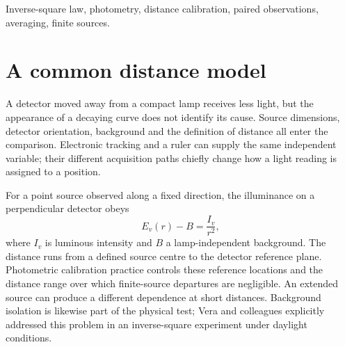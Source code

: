 \begin{abstract}
An inverse-square photometry experiment tests a distance dependence only after light and position have been associated with the same optical state. Two example investigations compare electronically tracked position with paired ruler observations. Fifteen stationary electronic windows give a power exponent of 2.0012. Twelve ruler snapshots give 1.9861; replacing each snapshot with a two-second interior mean gives 1.9880 while reducing the scatter of the distance-normalized signal from 1.82 to 0.58 count\,m$^2$. A one-millimetre change of distance origin shifts either mean-based exponent by approximately 0.005--0.006. Together the examples distinguish improvements in temporal averaging from knowledge of source geometry, background and the absolute photometric scale.
\end{abstract}
\begin{IEEEkeywords}
Inverse-square law, photometry, distance calibration, paired observations, averaging, finite sources.
\end{IEEEkeywords}

\section{A common distance model}
A detector moved away from a compact lamp receives less light, but the appearance of a decaying curve does not identify its cause. Source dimensions, detector orientation, background and the definition of distance all enter the comparison. Electronic tracking and a ruler can supply the same independent variable; their different acquisition paths chiefly change how a light reading is assigned to a position.

For a point source observed along a fixed direction, the illuminance on a perpendicular detector obeys
\begin{equation}
 E_v(r)-B=\frac{I_v}{r^2},
 \label{eq:illuminance-distance-law}
\end{equation}
where $I_v$ is luminous intensity and $B$ a lamp-independent background. The distance runs from a defined source centre to the detector reference plane. Photometric calibration practice controls these reference locations and the distance range over which finite-source departures are negligible\cite{zong2018}. An extended source can produce a different dependence at short distances\cite{campione2024}. Background isolation is likewise part of the physical test; Vera and colleagues explicitly addressed this problem in an inverse-square experiment under daylight conditions\cite{vera2014}.

